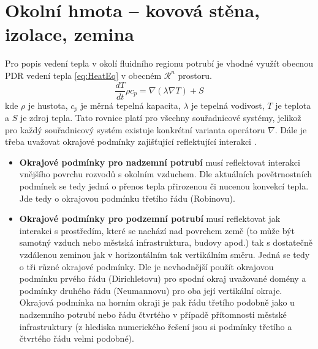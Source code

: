 \section{Okolní hmota – kovová stěna, izolace, zemina}
\label{sec:SurroundingMass}
Pro popis vedení tepla v okolí fluidního regionu potrubí je vhodné využít
obecnou PDR vedení tepla \ref{eq:HeatEq} v obecném \(\mathcal{R}^n\) prostoru.
\begin{equation}
  \label{eq:HeatEq}
  \frac{dT}{dt}\rho{c_p}=\nabla(\lambda\nabla{T})+S
\end{equation}
kde \(\rho\) je hustota, \(c_p\) je měrná tepelná kapacita, \(\lambda\) je
tepelná vodivost, \(T\) je teplota a \(S\) je zdroj tepla. Tato rovnice platí
pro všechny souřadnicové systémy, jelikož pro každý souřadnicový systém
existuje konkrétní varianta operátoru \(\nabla\). Dále je třeba uvažovat
okrajové podmínky zajišťující reflektující interakci .
\begin{itemize}
  \item
    \textbf{Okrajové podmínky pro nadzemní potrubí} musí reflektovat interakci
    vnějšího povrchu rozvodů s okolním vzduchem. Dle aktuálních povětrnostních
    podmínek se tedy jedná o přenos tepla přirozenou či nucenou
    konvekcí tepla. Jde tedy o okrajovou podmínku třetího řádu (Robinovu). 
  \item
    \textbf{Okrajové podmínky pro podzemní potrubí} musí reflektovat jak
    interakci s prostředím, které se nachází nad povrchem země (to může být
    samotný vzduch nebo městská infrastruktura, budovy apod.) tak s dostatečně
    vzdálenou zeminou jak v horizontálním tak vertikálním směru. Jedná se tedy
    o tři různé okrajové podmínky. Dle  je nevhodnější použít
    okrajovou podmínku prvého řádu (Dirichletovu) pro spodní okraj uvažované
    domény a podmínky druhého řádu (Neumannovu) pro oba její vertikální okraje.
    Okrajová podmínka na horním okraji je pak řádu třetího podobně jako u
    nadzemního potrubí nebo řádu čtvrtého v případě přítomnosti městské
    infrastruktury (z hlediska numerického řešení jsou si podmínky třetího a
    čtvrtého řádu velmi podobné).
\end{itemize}

